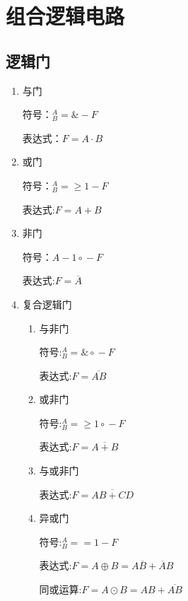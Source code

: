 \chapter{组合逻辑电路}
\newpage

\section{逻辑门}

\begin{enumerate}

    \item 与门

          符号：$^A_B\!\!=\!\!\boxed{\&}\!\!-\!\!{\scriptstyle F}$

          表达式：$F=A \cdot B$

    \item 或门

          符号：$^A_B\!\!=\!\!\boxed{\geq{1}}\!\!-\!\!{\scriptstyle F}$

          表达式:$F=A+B$

    \item 非门

          符号：$A\!\!-\!\!\boxed{1}{\scriptstyle\circ}\!\!-\!\!{\scriptstyle F}$

          表达式:$F=\overline A$

    \item 复合逻辑门

          \begin{enumerate}

              \item 与非门

                    符号:$^A_B\!\!=\!\!\boxed{\&}{\scriptstyle\circ} \!\!-\!\!{\scriptstyle F}$

                    表达式:$F=\overline{AB}$

              \item 或非门

                    符号:$^A_B\!\!=\!\!\boxed{\geq{1}}{\scriptstyle\circ} \!\!-\!\!{\scriptstyle F}$

                    表达式:$F=\overline{A+B}$

              \item 与或非门

                    表达式:$F=\overline{AB+CD}$

              \item 异或门

                    符号:$^A_B\!\!=\!\!\boxed{={1}} \!\!-\!\!{\scriptstyle F}$

                    表达式:$F=A\oplus{}B=A\overline{B}+\overline{A}B$

                    同或运算:$F=A\odot{}B=AB+\overline{AB}$

          \end{enumerate}

\end{enumerate}

